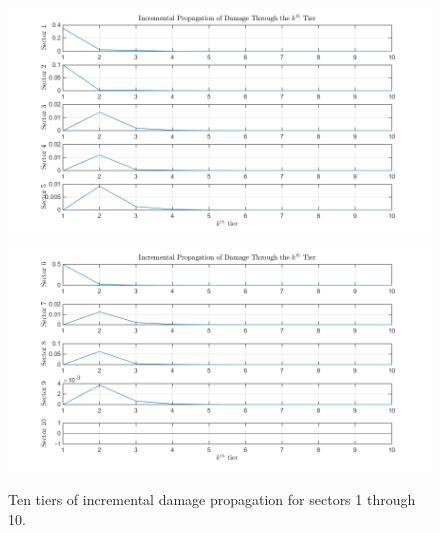 \documentclass[11pt,a4paper]{article}
\begin{document}
\begin{figure}[H]
	\centering
	\includegraphics[width=1\textwidth]
    {incremental_damage_propagation_1_5.png}
	\includegraphics[width=1\textwidth]
    {incremental_damage_propagation_6_10.png}
    \caption{Ten tiers of incremental damage propagation for sectors 1 through 10.}
    \label{fig: Incremental Damage Propagation 1-10}
\end{figure}
\end{document}
